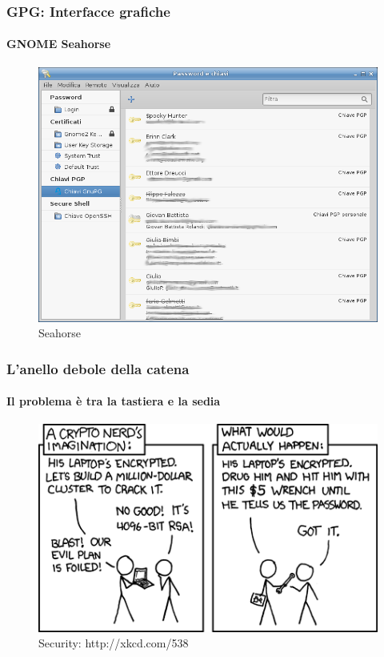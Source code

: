 \documentclass{beamer}
\begin{document}
\begin{frame}
  \frametitle{GPG: Interfacce grafiche}
  \framesubtitle{GNOME Seahorse}

  \begin{figure}
    \centering
    \includegraphics[width=.6\linewidth]{seahorse.png}
    \caption{Seahorse}
    \label{fig:seahorse0}
  \end{figure}
\end{frame}

\begin{frame}
  \frametitle{L'anello debole della catena}
  \framesubtitle{Il problema è tra la tastiera e la sedia}

  \begin{figure}
    \centering
    \includegraphics[width=.6\linewidth]{538.png}
    \caption{Security: http://xkcd.com/538}
    \label{fig:xkcd}
  \end{figure}

\end{frame}
\end{document}
